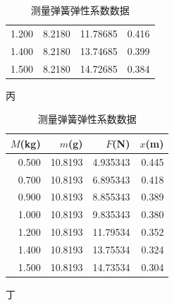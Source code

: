 \documentclass[a4paper,zihao=5,UTF8,fontset=fandol]{../phyreport}
\begin{document}
\begin{table}[H]
\begin{subtable}[b]{0.4\textwidth}
\begin{tabular}{rrrr}
			1.200  & 8.2180  & 11.78685 & 0.416  \\
			1.400  & 8.2180  & 13.74685 & 0.399  \\
			1.500  & 8.2180  & 14.72685 & 0.384  \\
			\bottomrule
		\end{tabular}
		\caption{丙}
	\end{subtable}
	\begin{subtable}{0.4\textwidth}
		\centering
		\begin{tabular}{rrrr}
			\toprule
			$M$(kg) & $m$(g) & $F$(N) & $x$(m) \\
			\midrule
			0.500  & 10.8193  & 4.935343 & 0.445  \\
			0.700  & 10.8193  & 6.895343 & 0.418  \\
			0.900  & 10.8193  & 8.855343 & 0.389  \\
			1.000  & 10.8193  & 9.835343 & 0.380  \\
			1.200  & 10.8193  & 11.79534 & 0.352  \\
			1.400  & 10.8193  & 13.75534 & 0.324  \\
			1.500  & 10.8193  & 14.73534 & 0.304  \\
			\bottomrule
		\end{tabular}
		\caption{丁}
	\end{subtable}
	\caption{测量弹簧弹性系数数据}
\end{table}
\end{document}
